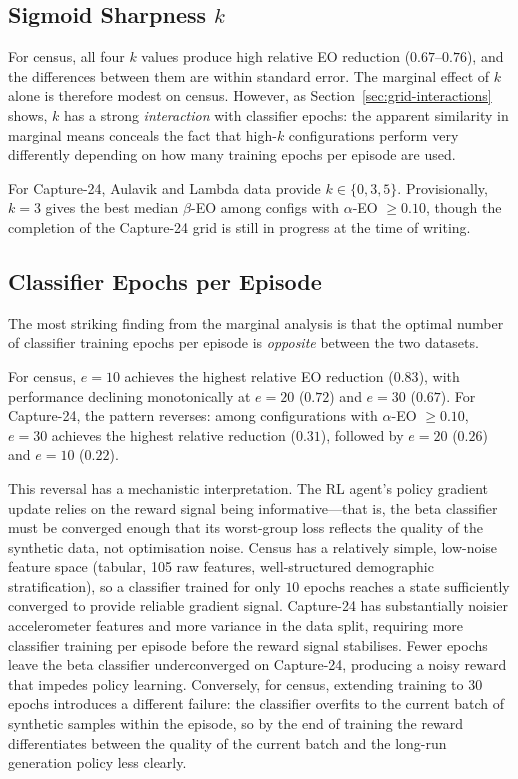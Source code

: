 \documentclass[12pt]{article}
\begin{document}
\subsection{Sigmoid Sharpness \texorpdfstring{$k$}{k}}

For census, all four $k$ values produce high relative EO reduction
($0.67$--$0.76$), and the differences between them are within standard error.
The marginal effect of $k$ alone is therefore modest on census.
However, as Section~\ref{sec:grid-interactions} shows, $k$ has a strong
\emph{interaction} with classifier epochs: the apparent similarity in
marginal means conceals the fact that high-$k$ configurations perform very
differently depending on how many training epochs per episode are used.

For Capture-24, Aulavik and Lambda data provide $k \in \{0, 3, 5\}$.
Provisionally, $k = 3$ gives the best median $\beta$-EO among configs
with $\alpha$-EO $\geq 0.10$, though the completion of the Capture-24 grid
is still in progress at the time of writing.

\subsection{Classifier Epochs per Episode}

The most striking finding from the marginal analysis is that the optimal
number of classifier training epochs per episode is \emph{opposite} between
the two datasets.

For census, $e = 10$ achieves the highest relative EO reduction ($0.83$),
with performance declining monotonically at $e = 20$ ($0.72$) and
$e = 30$ ($0.67$).
For Capture-24, the pattern reverses: among configurations with
$\alpha$-EO $\geq 0.10$, $e = 30$ achieves the highest relative reduction
($0.31$), followed by $e = 20$ ($0.26$) and $e = 10$ ($0.22$).

This reversal has a mechanistic interpretation.
The RL agent's policy gradient update relies on the reward signal being
informative---that is, the beta classifier must be converged enough that its
worst-group loss reflects the quality of the synthetic data, not optimisation
noise.
Census has a relatively simple, low-noise feature space (tabular, 105
raw features, well-structured demographic stratification), so a classifier
trained for only $10$ epochs reaches a state sufficiently converged to
provide reliable gradient signal.
Capture-24 has substantially noisier accelerometer features and more
variance in the data split, requiring more classifier training per episode
before the reward signal stabilises.
Fewer epochs leave the beta classifier underconverged on Capture-24,
producing a noisy reward that impedes policy learning.
Conversely, for census, extending training to $30$ epochs introduces a
different failure: the classifier overfits to the current batch of synthetic
samples within the episode, so by the end of training the reward
differentiates between the quality of the current batch and the long-run
generation policy less clearly.
\end{document}
